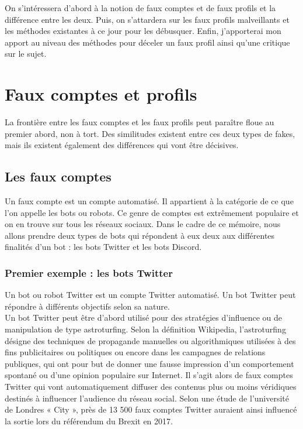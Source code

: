 \documentclass[12pt]{report}
\begin{document}
On s'intéressera d'abord à la notion de faux comptes et de faux profils et la différence entre les deux. Puis, on s'attardera sur les faux profils malveillants et les méthodes existantes à ce jour pour les débusquer. Enfin, j'apporterai mon apport au niveau des méthodes pour déceler un faux profil ainsi qu'une critique sur le sujet.

\chapter{Faux comptes et profils}
La frontière entre les faux comptes et les faux profils peut paraître floue au premier abord, non à tort. Des similitudes existent entre ces deux types de fakes, mais ils existent également des différences qui vont être décisives. 

\section{Les faux comptes}
Un faux compte est un compte automatisé. Il appartient à la catégorie de ce que l'on appelle les bots ou robots. Ce genre de comptes est extrêmement populaire et on en trouve sur tous les réseaux sociaux. Dans le cadre de ce mémoire, nous allons prendre deux types de bots qui répondent à eux deux aux différentes finalités d'un bot : les bots Twitter et les bots Discord. \\

\subsection{Premier exemple : les bots Twitter}
Un bot ou robot Twitter est un compte Twitter automatisé. Un bot Twitter peut répondre à différents objectifs selon sa nature. \\

Un bot Twitter peut être d’abord utilisé pour des stratégies d’influence ou de manipulation de type astroturfing. Selon la définition Wikipedia, l'astroturfing désigne des techniques de propagande manuelles ou algorithmiques utilisées à des fins publicitaires ou politiques ou encore dans les campagnes de relations publiques, qui ont pour but de donner une fausse impression d'un comportement spontané ou d'une opinion populaire sur Internet. Il s’agit alors de faux comptes Twitter qui vont automatiquement diffuser des contenus plus ou moins véridiques destinés à influencer l’audience du réseau social. Selon une étude de l’université de Londres « City », près de 13 500 faux comptes Twitter auraient ainsi influencé la sortie lors du référendum du Brexit en 2017.\\
\end{document}
